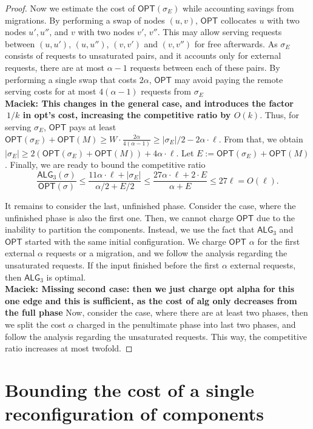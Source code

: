 \documentclass[manuscript,screen=true, review, anonymous]{acmart}
\newcommand{\OPT}{\textsf{OPT}\xspace}
\newcommand{\TAlg}{{\ensuremath{\textsf{ALG}_{3}}}\xspace}
\newcommand\maciek[1]{\color{brown}\textbf{\\ Maciek: #1}\color{black}}
\begin{document}
\begin{proof}
	
	Now we estimate the cost of $\OPT(\sigma_E)$ while accounting savings from migrations.
	By performing a swap of nodes $(u,v)$, $\OPT$ collocates $u$ with two nodes $u', u''$, and $v$ with two nodes $v'$, $v''$.
	This may allow serving requests between $(u,u')$, $(u,u'')$, $(v,v')$ and $(v,v'')$ for free afterwards.
	As $\sigma_E$ consists of requests to unsaturated pairs, and it accounts only for external requests, there are at most $\alpha-1$ requests between each of these pairs.
	By performing a single swap that costs $2\alpha$, $\OPT$ may avoid paying the remote serving costs for at most $4 (\alpha - 1)$ requests from $\sigma_E$
	\maciek{This changes in the general case, and introduces the factor $~1/k$ in opt's cost, increasing the competitive ratio by $O(k)$}.
	Thus, for serving $\sigma_E$, $\OPT$ pays at least $\OPT(\sigma_E) + \OPT(M) \geq W \cdot \frac{2\alpha}{4 (\alpha-1)}\geq |\sigma_E| / 2 - 2 \alpha \cdot \ell$.
	From that, we obtain $|\sigma_E| \geq 2(\OPT(\sigma_E)+\OPT(M)) + 4\alpha \cdot \ell$.
	Let $E := \OPT(\sigma_E) + \OPT(M)$. Finally, we are ready to bound the competitive ratio
	\begin{equation*}
		\frac{\TAlg(\sigma)}{\OPT(\sigma)} \leq \frac{11\alpha \cdot \ell + |\sigma_E|}{\alpha/2 + E/2} \leq \frac{27\alpha\cdot\ell + 2\cdot E}{\alpha + E} \leq 27 \ell = O(\ell).
	\end{equation*}
	
	\medskip
	
	It remains to consider the last, unfinished phase.
	Consider the case, where the unfinished phase is also the first one.
	Then, we cannot charge $\OPT$ due to the inability to partition the components.
	Instead, we use the fact that \TAlg and $\OPT$ started with the same initial configuration.
	We charge $\OPT$ $\alpha$ for the first external $\alpha$ requests or a migration,
	and we follow the analysis regarding the unsaturated requests.
	If the input finished before the first $\alpha$ external requests, then \TAlg is optimal.
	\maciek{Missing second case: then we just charge opt alpha for this one edge and this is sufficient, as the cost of alg only decreases from the full phase}
	Now, consider the case, where there are at least two phases, then we split the cost $\alpha$ charged in the penultimate phase into last two phases, and follow the analysis regarding the unsaturated requests.
	This way, the competitive ratio increases at most twofold.
\end{proof}


\section{Bounding the cost of a single reconfiguration of components}
\end{document}
